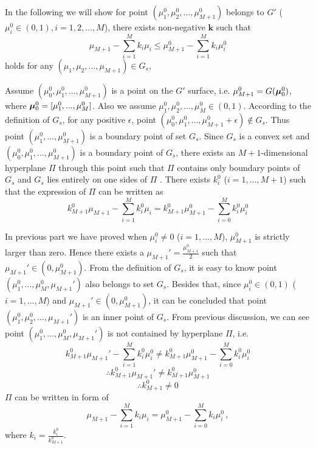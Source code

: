 In the following we will show for point $(\mu_1^0, \mu_2^0, ..., \mu_{M+1}^0)$ belongs to $G'$ ($\mu_i^0 \in (0, 1), i = 1, 2, ..., M$), there exists non-negative $\mathbf{k}$ such that  
\[
\mu_{M+1} - \sum_{i=1}^{M}k_i\mu_i \leq \mu_{M+1}^0 - \sum_{i=1}^{M}k_i\mu_i^0
\]
holds for any $(\mu_1, \mu_2, ..., \mu_{M+1}) \in G_s$, 

Assume $(\mu_0^0, \mu_1^0, ..., \mu_{M+1}^0)$ is a point on the $G'$ surface, i.e. $\mu_{M+1}^0 = G(\boldsymbol{\mu}_0^0)$, where $\boldsymbol{\mu}_0^0 = [\mu_1^0, ..., \mu_{M}^0]$. 
Also we assume $\mu_1^0, \mu_2^0, ..., \mu_M^0 \in (0, 1)$. 
According to the definition of $G_s$, for any positive $\epsilon$, point $(\mu_0^0, \mu_1^0, ..., \mu_{M+1}^0+\epsilon) \notin G_s$. Thus point $(\mu_1^0, ..., \mu_{M+1}^0)$ is a boundary point of set $G_s$.  
Since $G_s$ is a convex set and $(\mu_0^0, \mu_1^0, ..., \mu_{M+1}^0)$ is a boundary point of $G_s$,  
there exists an $M+1$-dimensional hyperplane $\Pi$ through this point such that $\Pi$ contains only boundary points of $G_s$ and $G_s$ lies entirely on one sides of $\Pi$  \cite{dantzig1951fundamental}. 
 There exists $k_i^0$ ($i=1, ..., M+1$) such that the expression of $\Pi$ can be written as
\begin{equation}
\label{PI}
k_{M+1}^0\mu_{M+1} - \sum_{i=1}^{M}k_i^0\mu_i = k_{M+1}^0\mu_{M+1}^0 - \sum_{i=0}^{M}k_i^0\mu_i^0
\end{equation}

In previous part we have proved when $\mu^0_i\neq 0$ ($i=1, ..., M$), $\mu_{M+1}^0 $ is strictly larger than zero. Hence there exists a $\mu_{M+1}' = \frac{\mu_{M+1}^0}{2}$ such that $\mu_{M+1}' \in (0, \mu_{M+1}^0)$. From the definition of $G_s$, it is easy to know point $(\mu^0_1, ..., \mu^0_M, \mu_{M+1}')$ also belongs to set $G_s$. Besides that, since $\mu^0_i \in (0, 1)$ ($i=1, ..., M$) and $\mu_{M+1}' \in (0, \mu_{M+1}^0)$, it can be concluded that point $(\mu_1^0, \mu_2^0, ..., \mu_{M+1}')$ is an inner point of $G_s$.
From previous discussion, we can see point $(\mu^0_1, ..., \mu^0_M, \mu_{M+1}')$ is not contained by hyperplane $\Pi$, i.e.
\[
k_{M+1}^0\mu_{M+1}' - \sum_{i=1}^{M}k_i^0\mu_i^0 \neq k_{M+1}^0\mu_{M+1}^0 - \sum_{i=0}^{M}k_i^0\mu_i^0
\]
\[
\therefore k_{M+1}^0\mu_{M+1}' \neq k_{M+1}^0\mu_{M+1}^0
\]
\[
\therefore k_{M+1}^0 \neq 0
\]
 $\Pi$ can be written in form of 
\begin{equation}
\label{PI2}
\mu_{M+1} - \sum_{i=1}^{M}k_i\mu_i = \mu_{M+1}^0 - \sum_{i=0}^{M}k_i\mu_i^0\,,
\end{equation}
where $k_i = \frac{k_i^0}{k_{M+1}^0}$. 

